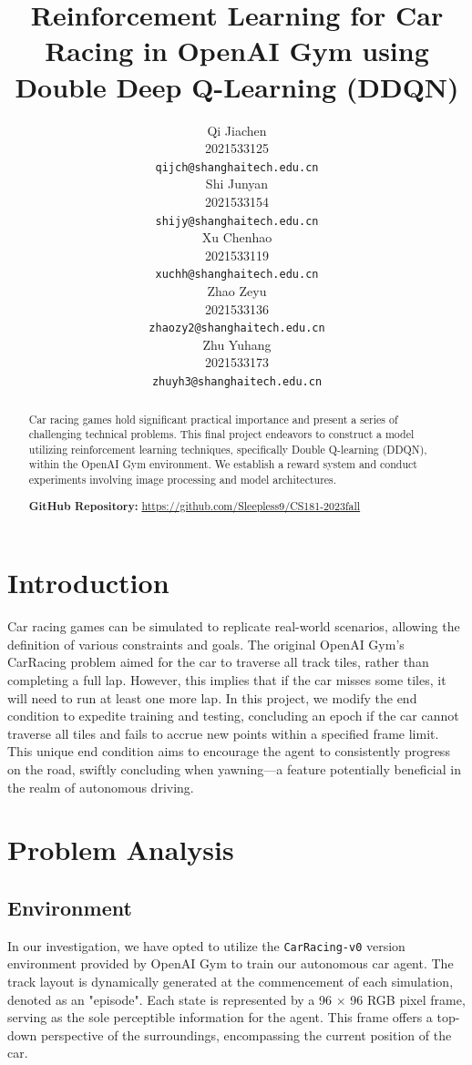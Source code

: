 \documentclass{article}
\title{Reinforcement Learning for Car Racing in OpenAI Gym using Double Deep Q-Learning (DDQN)}
\author{%
  Qi Jiachen \\
  2021533125 \\
  \texttt{qijch@shanghaitech.edu.cn} \\
  \And
  Shi Junyan \\
  2021533154 \\
  \texttt{shijy@shanghaitech.edu.cn} \\
  \AND
  Xu Chenhao \\
  2021533119 \\
  \texttt{xuchh@shanghaitech.edu.cn} \\
  \And
  Zhao Zeyu \\
  2021533136 \\
  \texttt{zhaozy2@shanghaitech.edu.cn} \\
  \And
  Zhu Yuhang \\
  2021533173 \\
  \texttt{zhuyh3@shanghaitech.edu.cn} \\
}
\begin{document}
\maketitle


\begin{abstract}
Car racing games hold significant practical importance and present a series of challenging technical problems. This final project endeavors to construct a model utilizing reinforcement learning techniques, specifically Double Q-learning (DDQN), within the OpenAI Gym environment. We establish a reward system and conduct experiments involving image processing and model architectures.

\textbf{GitHub Repository:} \url{https://github.com/Sleepless9/CS181-2023fall}
\end{abstract}

\section{Introduction}

Car racing games can be simulated to replicate real-world scenarios, allowing the definition of various constraints and goals. The original OpenAI Gym's CarRacing problem aimed for the car to traverse all track tiles, rather than completing a full lap. However, this implies that if the car misses some tiles, it will need to run at least one more lap. In this project, we modify the end condition to expedite training and testing, concluding an epoch if the car cannot traverse all tiles and fails to accrue new points within a specified frame limit. This unique end condition aims to encourage the agent to consistently progress on the road, swiftly concluding when yawning—a feature potentially beneficial in the realm of autonomous driving.


\section{Problem Analysis}
\subsection{Environment}
In our investigation, we have opted to utilize the \texttt{CarRacing-v0} version environment provided by OpenAI Gym to train our autonomous car agent. The track layout is dynamically generated at the commencement of each simulation, denoted as an "episode". Each state is represented by a 96 $\times$ 96 RGB pixel frame, serving as the sole perceptible information for the agent. This frame offers a top-down perspective of the surroundings, encompassing the current position of the car.
\end{document}
